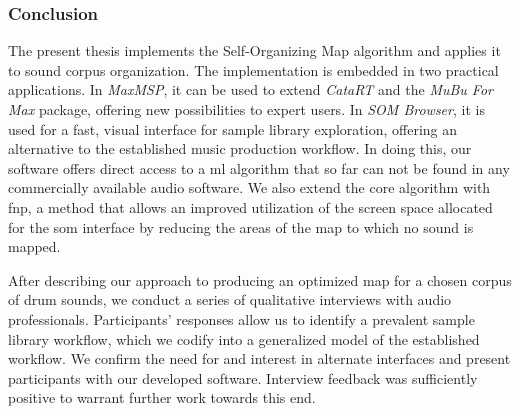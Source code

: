 \subsubsection{Conclusion}
\label{subsubsec:discussion_conclusion}
The present thesis implements the Self-Organizing Map algorithm and applies it
to sound corpus organization. The implementation is embedded in two practical
applications. In \textit{MaxMSP}, it can be used to extend \textit{CataRT} and
the \textit{MuBu For Max} package, offering new possibilities to expert users.
In \textit{SOM Browser}, it is used for a fast, visual interface for
sample library exploration, offering an alternative to the established music
production workflow. In doing this, our software offers direct access to a
\gls{ml} algorithm that so far can not be found in any commercially available
audio software. We also extend the core algorithm with \gls{fnp}, a method that
allows an improved utilization of the screen space allocated for the \gls{som}
interface by reducing the areas of the map to which no sound is mapped.

\smallskip

After describing our approach to producing an optimized map for a chosen corpus
of drum sounds, we conduct a series of qualitative interviews with audio
professionals. Participants' responses allow us to identify a prevalent sample
library workflow, which we codify into a generalized model of the established
workflow. We confirm the need for and interest in alternate interfaces and
present participants with our developed software. Interview feedback was
sufficiently positive to warrant further work towards this end.


